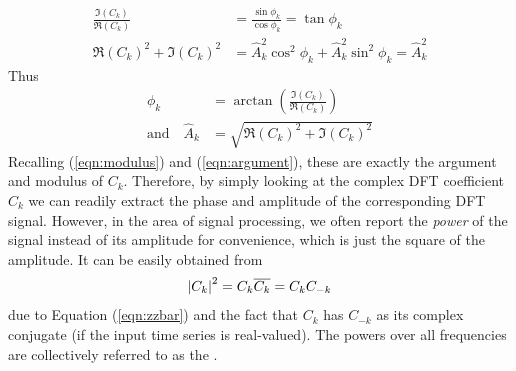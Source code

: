 \begin{subequations}
\begin{align}
\frac{\Im(C_k)}{\Re(C_k)} &= \frac{\sin \phi_k}{\cos \phi_k} = \tan \phi_k \\
\Re(C_k)^2 + \Im(C_k)^2 &= \hat{A}_k^2 \cos^2 \phi_k + \hat{A}_k^2 \sin^2 \phi_k = \hat{A}_k^2 
\end{align}
\end{subequations}
Thus 
\begin{subequations}
\begin{align}
\phi_k &= \arctan(\frac{\Im(C_k)}{\Re(C_k)}) \\
\text{and} \quad \hat{A}_k &= \sqrt{\Re(C_k)^2 + \Im(C_k)^2}  
\end{align}   
\end{subequations}
Recalling (\ref{eqn:modulus}) and (\ref{eqn:argument}), these are exactly the argument and modulus of $C_k$. Therefore, by simply looking at the complex DFT coefficient $C_k$ we can readily extract the phase and amplitude of the corresponding DFT signal. However, in the area of signal processing, we often report the \textit{power} of the signal instead of its amplitude for convenience, which is just the square of the amplitude. It can be easily obtained from
\begin{align}
\abs{C_k}^2 = C_k\overline{C_k} = C_kC_{-k}
\end{align}
due to Equation (\ref{eqn:zzbar}) and the fact that $C_k$ has $C_{-k}$ as its complex conjugate (if the input time series is real-valued). The powers over all frequencies are collectively referred to as the .

